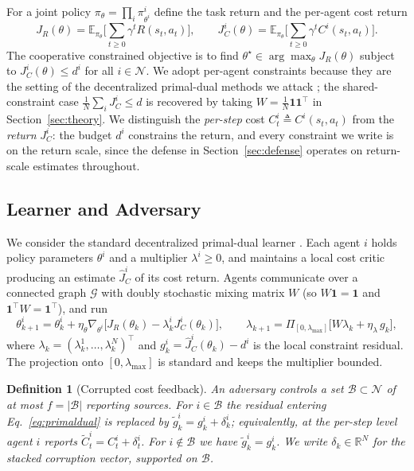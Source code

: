 \documentclass{article}
\newtheorem{definition}{Definition}
\begin{document}
For a joint policy $\pi_\theta = \prod_i \pi^i_{\theta^i}$ define the task return and the per-agent cost return
\begin{equation}
J_R(\theta) = \mathbb{E}_{\pi_\theta}\Big[\textstyle\sum_{t\ge 0}\gamma^t R(s_t,a_t)\Big],
\qquad
J_C^i(\theta) = \mathbb{E}_{\pi_\theta}\Big[\textstyle\sum_{t\ge 0}\gamma^t C^i(s_t,a_t)\Big].
\label{eq:returns}
\end{equation}
The cooperative constrained objective is to find $\theta^\star \in \arg\max_\theta J_R(\theta)$ subject to $J_C^i(\theta)\le d^i$ for all $i\in\mathcal{N}$. We adopt per-agent constraints because they are the setting of the decentralized primal-dual methods we attack \citep{lu2021decentralized,ying2024scalable,kahe2024distributed}; the shared-constraint case $\frac{1}{N}\sum_i J_C^i \le d$ is recovered by taking $W = \frac{1}{N}\mathbf{1}\mathbf{1}^\top$ in Section~\ref{sec:theory}. We distinguish the \emph{per-step} cost $C^i_t \triangleq C^i(s_t,a_t)$ from the \emph{return} $J^i_C$: the budget $d^i$ constrains the return, and every constraint we write is on the return scale, since the defense in Section~\ref{sec:defense} operates on return-scale estimates throughout.

\subsection{Learner and Adversary}

We consider the standard decentralized primal-dual learner \citep{lu2021decentralized,kahe2024distributed}. Each agent $i$ holds policy parameters $\theta^i$ and a multiplier $\lambda^i \ge 0$, and maintains a local cost critic producing an estimate $\hat{J}^i_C$ of its cost return. Agents communicate over a connected graph $\mathcal{G}$ with doubly stochastic mixing matrix $W$ (so $W\mathbf{1}=\mathbf{1}$ and $\mathbf{1}^\top W = \mathbf{1}^\top$), and run
\begin{equation}
\theta^i_{k+1} = \theta^i_k + \eta_\theta \nabla_{\theta^i}\big[J_R(\theta_k) - \lambda^i_k J^i_C(\theta_k)\big],
\qquad
\lambda_{k+1} = \Pi_{[0,\lambda_{\max}]}\big[W\lambda_k + \eta_\lambda\, g_k\big],
\label{eq:primaldual}
\end{equation}
where $\lambda_k = (\lambda^1_k,\dots,\lambda^N_k)^\top$ and $g^i_k = \hat{J}^i_C(\theta_k) - d^i$ is the local constraint residual. The projection onto $[0,\lambda_{\max}]$ is standard and keeps the multiplier bounded.

\begin{definition}[Corrupted cost feedback]
\label{def:corruption}
An adversary controls a set $\mathcal{B}\subset\mathcal{N}$ of at most $f = |\mathcal{B}|$ reporting sources. For $i\in\mathcal{B}$ the residual entering Eq.~\eqref{eq:primaldual} is replaced by $\tilde{g}^i_k = g^i_k + \delta^i_k$; equivalently, at the per-step level agent $i$ reports $\tilde{C}^i_t = C^i_t + \delta^i_t$. For $i\notin\mathcal{B}$ we have $\tilde{g}^i_k = g^i_k$. We write $\delta_k\in\mathbb{R}^N$ for the stacked corruption vector, supported on $\mathcal{B}$.
\end{definition}
\end{document}
